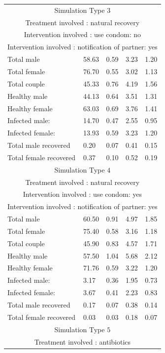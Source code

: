 \documentclass{article}
\begin{document}
\begin{normalsize}
\begin{longtable}{|p{5cm}|p{3cm}|p{3cm}|p{3cm}|p{3cm}|}
	\hline
	\multicolumn{5}{|c|}{Simulation Type $3$} \\
	\multicolumn{5}{|c|}{Treatment involved : natural recovery} \\
	\multicolumn{5}{|c|}{Intervention involved : use condom: no} \\
	\multicolumn{5}{|c|}{Intervention involved : notification of partner: yes} \\
	\hline
	Total male & 58.63  & 0.59 & 3.23 & 1.20\\
	Total female & 76.70 & 0.55 & 3.02 & 1.13\\
	Total couple & 45.33 & 0.76 & 4.19 & 1.56\\
	Healthy male & 44.13 & 0.64 & 3.51 & 1.31\\
	Healthy female & 63.03 & 0.69 & 3.76 & 1.41\\
	Infected male: & 14.70 & 0.47 & 2.55 & 0.95\\
	Infected female: & 13.93 & 0.59 & 3.23 & 1.20\\
	Total male recovered & 0.20 & 0.07 & 0.41 & 0.15\\
	Total female recovered & 0.37 & 0.10 & 0.52 & 0.19\\		
	\hline
	\multicolumn{5}{|c|}{Simulation Type $4$} \\
	\multicolumn{5}{|c|}{Treatment involved : natural recovery} \\
	\multicolumn{5}{|c|}{Intervention involved : use condom: yes} \\
	\multicolumn{5}{|c|}{Intervention involved : notification of partner: yes} \\
	\hline
	Total male & 60.50 & 0.91 & 4.97 & 1.85\\
	Total female & 75.40 & 0.58 & 3.16 & 1.18\\
	Total couple & 45.90 & 0.83 & 4.57 & 1.71\\
	Healthy male & 57.50 & 1.04 & 5.68 & 2.12\\
	Healthy female & 71.76 & 0.59 &  3.22 & 1.20\\
	Infected male: & 3.17 & 0.36 & 1.95 & 0.73\\
	Infected female: & 3.67 & 0.41 & 2.23 & 0.83\\
	Total male recovered & 0.17 & 0.07 & 0.38 & 0.14 \\
	Total female recovered & 0.03 & 0.03 & 0.18 & 0.07\\		
	\hline
	\multicolumn{5}{|c|}{Simulation Type $5$} \\
	\multicolumn{5}{|c|}{Treatment involved : antibiotics} \\

\end{longtable}
\end{normalsize}
\end{document}
